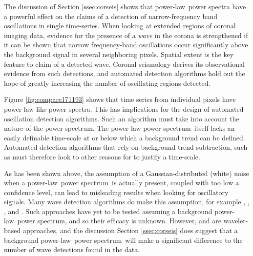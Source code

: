 \documentclass{aastex}
\newcommand{\PS}{power spectrum}
\newcommand{\PL}{power-law}
\begin{document}
The discussion of Section \ref{ssec:corseis} shows that \PL\ power
spectra have a powerful effect on the claims of a detection of
narrow-frequency band oscillations in single time-series.  When
looking at extended regions of coronal imaging data, evidence for the
presence of a {\it wave} in the corona is strengthened if it can be
shown that narrow frequency-band oscillations occur significantly
above the background signal in several neighboring pixels.  Spatial
extent is the key feature to claim of a detected wave.  Coronal
seismology derives its observational evidence from such detections,
and automated detection algorithms hold out the hope of greatly
increasing the number of oscillating regions detected.

Figure \ref{fig:compare171193} shows that time series from individual
pixels have power-law like power spectra.  This has implications for
the design of automated oscillation detection algorithms.  Such an
algorithm must take into account the nature of the \PS.  The power-law
\PS\ itself lacks an easily definable time-scale at or below which a
background trend can be defined.  Automated detection algorithms that
rely on background trend subtraction, such as
\cite{2010SoPh..264..403I} must therefore look to other reasons for to
justify a time-scale.

As has been shown above, the assumption of a Gaussian-distributed
(white) noise when a \PL\ \PS\ is actually present, coupled with too
low a confidence level, can lead to misleading results when looking
for oscillatory signals.  Many wave detection algorithms do make this
assumption, for example \cite{2004SoPh..223....1D},
\cite{2007SoPh..241..397N}, \cite{2008SoPh..248..395S},
\cite{2010SoPh..264..403I} and \cite{2013SoPh..286..405C}.  Such
approaches have yet to be tested assuming a background \PL\ \PS, and
so their efficacy is unknown.  However, \cite{2004SoPh..223....1D} and
\cite{2008SoPh..248..395S} are wavelet-based approaches, and the
discussion Section \ref{ssec:corseis} does suggest that a background
\PL\ \PS\ will make a significant difference to the number of wave
detections found in the data.
\end{document}

